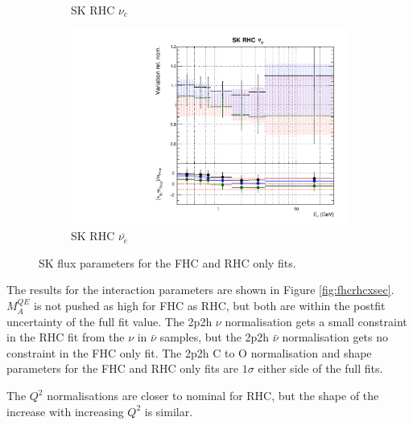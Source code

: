 \begin{figure}
\begin{subfigure}{0.45\textwidth}
  \caption{SK RHC $\nu_{e}$}
\end{subfigure}
\begin{subfigure}{0.45\textwidth}
  \centering
  \includegraphics[width=0.75\linewidth]{figs/fhcrhcfitsflux_15}
  \caption{SK RHC $\bar{\nu_e}$}
\end{subfigure}
\caption{SK flux parameters for the FHC and RHC only fits.}
\label{fig:fhcrhcfluxSK}
\end{figure}

The results for the interaction parameters are shown in Figure \ref{fig:fhcrhcxsec}. $M_{A}^{QE}$ is not pushed as high for FHC as RHC, but both are within the postfit uncertainty of the full fit value. The 2p2h $\nu$ normalisation gets a small constraint in the RHC fit from the $\nu$ in $\bar{\nu}$ samples, but the 2p2h $\bar{\nu}$ normalisation gets no constraint in the FHC only fit. The 2p2h C to O normalisation and shape parameters for the FHC and RHC only fits are $1\sigma$ either side of the full fits. 

The $Q^2$ normalisations are closer to nominal for RHC, but the shape of the increase with increasing $Q^2$ is similar. 

